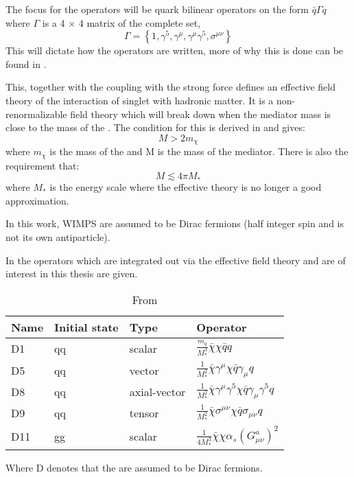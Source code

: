 The focus for the operators will be quark bilinear operators on the form $\bar{q}\Gamma q$ where $\Gamma$ is a 4 $\times$ 4 matrix of the complete set, 
\begin{equation}
\Gamma = \left\lbrace 1,\gamma ^5,\gamma ^\mu,\gamma ^\mu \gamma ^5, \sigma ^{\mu \nu} \right\rbrace
\end{equation}
This will dictate how the operators are written, more of why this is done can be found in \citep{82.116010,Goodman:2010,Zee:2003}.

This, together with the coupling with the strong force defines an effective field theory of the interaction of singlet \abbrWIMPS with hadronic matter. It is a non-renormalizable field theory which will break down when the mediator mass is close to the mass of the \abbrWIMP .
The condition for this is derived in \citep{82.116010} and gives:
\begin{equation}
M > 2 m_\chi
\end{equation}
where $m_\chi$ is the mass of the \abbrWIMP and M is the mass of the mediator. There is also the requirement that:
\begin{equation}
M \lesssim 4 \pi M_*
\end{equation}
where $M_*$ is the energy scale where the effective theory is no longer a good approximation.

In this work, WIMPS are assumed to be Dirac fermions (half integer spin and is not its own antiparticle). 
 
In  the operators which are integrated out via the effective field theory and are of interest in this thesis are given.
\renewcommand{\arraystretch}{1.5} %
\begin{table}[H]
\begin{center}
    \begin{tabular}{ | l | l | l | l |}
    \hline
    Name & Initial state & Type & Operator \\ \hline
  	D1 & qq & scalar & $\frac{m_q}{M^3_*} \bar{\chi} \chi \bar{q} q$ \\ \hline
  	D5 & qq & vector & $\frac{1}{M^2_*} \bar{\chi} \gamma^\mu \chi \bar{q} \gamma_\mu q$ \\ \hline
  	D8 & qq & axial-vector & $\frac{1}{M^2_*}\bar{\chi}\gamma^\mu \gamma^5 \chi \bar{q} \gamma_\mu \gamma^5 q $ \\ \hline
  	D9 & qq & tensor & $\frac{1}{M^2_*} \bar{\chi}\sigma^{\mu \nu} \chi \bar{q} \sigma_{\mu \nu} q  $\\ \hline
  	D11 & gg & scalar & $\frac{1}{4M^3_*}\bar{\chi}\chi \alpha_s (G^a_{\mu \nu})^2 $\\ \hline
  	\end{tabular}

  	\caption{From \citep{CERN-PH-EP-2012-210}}
  	\label{tab:operators}
  	  	\end{center}
    \end{table}
\renewcommand{\arraystretch}{1.0}  %
Where D denotes that the \abbrWIMPS are assumed to be Dirac fermions.

